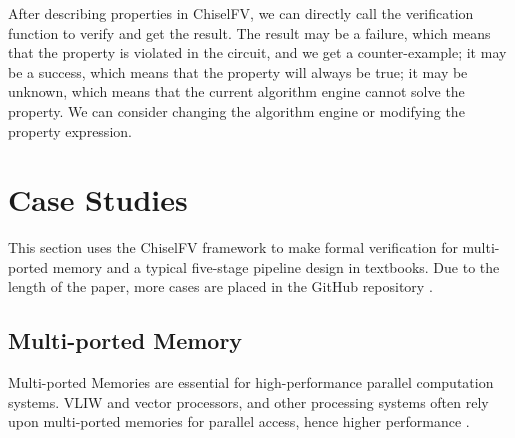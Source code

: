 \documentclass[conference]{IEEEtran}
\theoremstyle{definition}
\begin{document}
After describing properties in ChiselFV, we can directly call the verification function to verify and get the result.
The result may be a failure, which means that the property is violated in the circuit, and we get a counter-example; 
it may be a success, which means that the property will always be true; 
it may be unknown, which means that the current algorithm engine cannot solve the property. We can consider changing the algorithm engine or modifying the property expression.

\section{Case Studies}

This section uses the ChiselFV framework to make formal verification for multi-ported memory and a typical five-stage pipeline design in textbooks.
Due to the length of the paper, more cases are placed in the GitHub repository \cite{ChiselFV}.

\subsection{Multi-ported Memory}

Multi-ported Memories are essential for high-performance parallel computation systems. VLIW and vector processors, and other processing systems often rely upon multi-ported memories for parallel access, hence higher performance \cite{abdelhadi2014modular}. 
\end{document}
